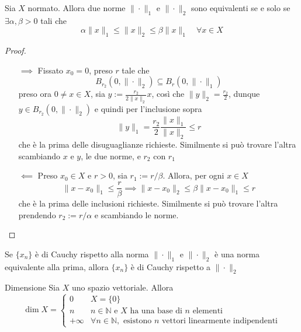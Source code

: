 \begin{proposition}{}
    Sia \(X\) normato. Allora due norme \(\|\cdot \|_1\) e \(\|\cdot \|_2\) sono
    equivalenti se e solo se \(\exists \alpha, \beta > 0\) tali che
    \[
      \alpha \|x\|_1 \le \|x\|_2 \le \beta \|x\|_1 \quad \forall x \in X
    \]
\end{proposition}
\begin{proof}\( \)
\begin{itemize}
    \item[\(\implies \)] Fissato \(x_{0} = 0\), preso \(r\) tale che 
        \[
          B_{r_{2}} {(0, \|\cdot \|_2)} \subseteq B_r{(0, \|\cdot \|_1)} 
        \]
        preso ora \(0\neq x \in X\), sia \(y := \frac{r_{2}}{2 \|x\|_2}x\), così
        che \(\|y\|_2 = \frac{r_{2}}{2} \), dunque \(y \in 
        B_{r_{2}} {(0, \|\cdot \|_2)}\) e quindi per l'inclusione sopra
        \[
          \|y\|_1 = \frac{r_{2}}{2} \frac{\|x\|_1}{\|x\|_2} \le r 
        \]
        che è la prima delle disuguaglianze richieste. Similmente si può trovare
        l'altra scambiando \(x\) e \(y\), le due norme, e \(r_{2}\) con \(r_{1}\) 
    \item[\(\impliedby \)] Preso \(x_{0} \in X\) e \(r > 0\), sia \(r_{1} := r /
        \beta\). Allora, per ogni \(x \in X\) 
        \[
          \|x - x_{0}\|_1 \le \frac{r}{\beta} \implies \|x-x_{0}\|_2 \le \beta
          \|x - x_{0}\|_1 \le r
        \]
        che è la prima delle inclusioni richieste. Similmente si può trovare
        l'altra prendendo \(r_{2} := r / \alpha\) e scambiando le norme.
\end{itemize}
\end{proof}

\begin{remark}{}
    Se \(\{x_{n}\} \) è di Cauchy rispetto alla norma \(\|\cdot \|_1\) e \(\|\cdot \|_2\) è una norma equivalente alla prima, allora \(\{x_{n}\} \) è di Cauchy rispetto a \(\|\cdot \|_2\) 
\end{remark}

\begin{definition}{Dimensione}
    Sia \(X\) uno spazio vettoriale. Allora 
    \[
      \dim X = \begin{cases}{}
          0 & X = \{0\} \\
          n & n \in \mathbb{N} \text{ e \(X\) ha una base di \(n\) elementi} \\
          +\infty & \forall n \in \mathbb{N}, \text{ esistono \(n\) vettori linearmente indipendenti}
      \end{cases}
    \]
\end{definition}


